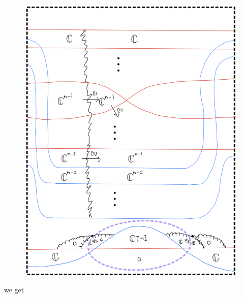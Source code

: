 \begin{enumerate}[label = (\roman*)]
\begin{enumerate}[label = (Case \arabic*)]
\begin{enumerate}[label = (Step \arabic*)]
\begin{figure}[H]
    \centering
    \includegraphics[scale = 0.95]{diagrams/cobord_gen/4.png}
    \caption{}
    \label{fig:your-label}
\end{figure}
\pagebreak
we get


\end{enumerate}
\end{enumerate}
\end{enumerate}
